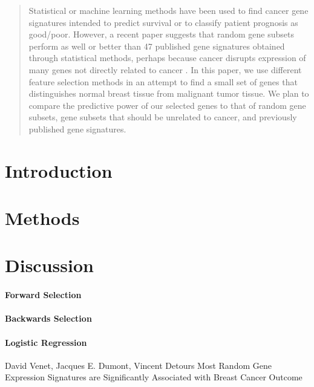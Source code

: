 \documentclass[11pt]{article}
\begin{document}
\maketitle

\begin{abstract}
Statistical or machine learning methods have been used to find cancer gene signatures intended to predict survival or to classify patient prognosis as good/poor. However, a recent paper suggests that random gene subsets perform as well or better than 47 published gene signatures obtained through statistical methods, perhaps because cancer disrupts expression of many genes not directly related to cancer \cite{venet}. In this paper, we use different feature selection methods in an attempt to find a small set of genes that distinguishes normal breast tissue from malignant tumor tissue. We plan to compare the predictive power of our selected genes to that of random gene subsets, gene subsets that should be unrelated to cancer, and previously published gene signatures.
\end{abstract}

\section{Introduction}

\section{Methods}


\section{Discussion}

\paragraph{Forward Selection}
\paragraph{Backwards Selection}
\paragraph{Logistic Regression}

\begin{thebibliography}{9}

  David Venet, Jacques E. Dumont, Vincent Detours
  Most Random Gene Expression Signatures are Significantly Associated with Breast Cancer Outcome
\end{thebibliography}
\end{document}
